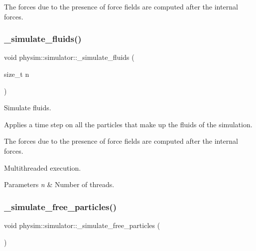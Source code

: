The forces due to the presence of force fields are computed after the internal forces. \mbox{\label{classphysim_1_1simulator_a5b0b7e9c7790144f17d5de13c8d098dc}} 
\subsubsection{\texorpdfstring{\+\_\+simulate\+\_\+fluids()}{\_simulate\_fluids()}\hspace{0.1cm}{\footnotesize\ttfamily [2/2]}}
{\footnotesize\ttfamily void physim\+::simulator\+::\+\_\+simulate\+\_\+fluids (\begin{DoxyParamCaption}\item[{size\+\_\+t}]{n }\end{DoxyParamCaption})\hspace{0.3cm}{\ttfamily [private]}}



Simulate fluids. 

Applies a time step on all the particles that make up the fluids of the simulation.

The forces due to the presence of force fields are computed after the internal forces.

Multithreaded execution. 
\begin{DoxyParams}{Parameters}
{\em n} & Number of threads. \\
\hline
\end{DoxyParams}
\mbox{\label{classphysim_1_1simulator_ae553797df3ee38cfe3c93bbc0b94be06}} 
\subsubsection{\texorpdfstring{\+\_\+simulate\+\_\+free\+\_\+particles()}{\_simulate\_free\_particles()}\hspace{0.1cm}{\footnotesize\ttfamily [1/2]}}
{\footnotesize\ttfamily void physim\+::simulator\+::\+\_\+simulate\+\_\+free\+\_\+particles (\begin{DoxyParamCaption}{ }\end{DoxyParamCaption})\hspace{0.3cm}{\ttfamily [private]}}



